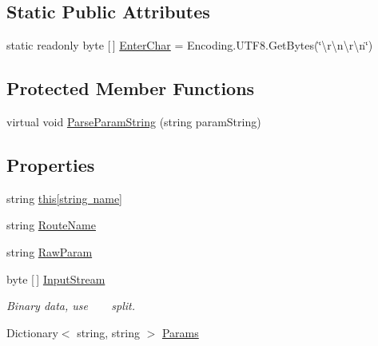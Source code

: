 \subsection*{Static Public Attributes}
\begin{DoxyCompactItemize}
\item 
static readonly byte \mbox{[}$\,$\mbox{]} \mbox{\hyperlink{class_t_net_1_1_contract_1_1_package_reader_a58d7d559d7fd096b245fbb12e8011656}{Enter\+Char}} = Encoding.\+U\+T\+F8.\+Get\+Bytes(\char`\"{}\textbackslash{}r\textbackslash{}n\textbackslash{}r\textbackslash{}n\char`\"{})
\end{DoxyCompactItemize}
\subsection*{Protected Member Functions}
\begin{DoxyCompactItemize}
\item 
virtual void \mbox{\hyperlink{class_t_net_1_1_contract_1_1_package_reader_a2f4888f329d5b167b1f6683a7c76e1be}{Parse\+Param\+String}} (string param\+String)
\end{DoxyCompactItemize}
\subsection*{Properties}
\begin{DoxyCompactItemize}
\item 
string \mbox{\hyperlink{class_t_net_1_1_contract_1_1_package_reader_a29f56ae38116d008987d129e970296f3}{this\mbox{[}string name\mbox{]}}}
\item 
string \mbox{\hyperlink{class_t_net_1_1_contract_1_1_package_reader_a89ff50826bab14520f49e6d1cb8eae97}{Route\+Name}}
\item 
string \mbox{\hyperlink{class_t_net_1_1_contract_1_1_package_reader_a4cd6ac1eaf949d251cf1f2dec6b19f5e}{Raw\+Param}}
\item 
byte \mbox{[}$\,$\mbox{]} \mbox{\hyperlink{class_t_net_1_1_contract_1_1_package_reader_afd829c2a58411b4b3db8619dd8c2e431}{Input\+Stream}}
\begin{DoxyCompactList}\small\item\em Binary data, use \textquotesingle{}~\newline
~\newline
\textquotesingle{} split. \end{DoxyCompactList}\item 
Dictionary$<$ string, string $>$ \mbox{\hyperlink{class_t_net_1_1_contract_1_1_package_reader_af82b6779f0adda251996091edd512379}{Params}}
\end{DoxyCompactItemize}


